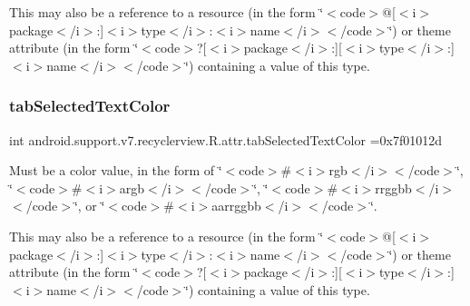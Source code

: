This may also be a reference to a resource (in the form \char`\"{}$<$code$>$@\mbox{[}$<$i$>$package$<$/i$>$\+:\mbox{]}$<$i$>$type$<$/i$>$\+:$<$i$>$name$<$/i$>$$<$/code$>$\char`\"{}) or theme attribute (in the form \char`\"{}$<$code$>$?\mbox{[}$<$i$>$package$<$/i$>$\+:\mbox{]}\mbox{[}$<$i$>$type$<$/i$>$\+:\mbox{]}$<$i$>$name$<$/i$>$$<$/code$>$\char`\"{}) containing a value of this type. \mbox{\label{classandroid_1_1support_1_1v7_1_1recyclerview_1_1R_1_1attr_affa0c815ddd832ba9ebad5e166e269c8}} 
\subsubsection{\texorpdfstring{tab\+Selected\+Text\+Color}{tabSelectedTextColor}}
{\footnotesize\ttfamily int android.\+support.\+v7.\+recyclerview.\+R.\+attr.\+tab\+Selected\+Text\+Color =0x7f01012d\hspace{0.3cm}{\ttfamily [static]}}

Must be a color value, in the form of \char`\"{}$<$code$>$\#$<$i$>$rgb$<$/i$>$$<$/code$>$\char`\"{}, \char`\"{}$<$code$>$\#$<$i$>$argb$<$/i$>$$<$/code$>$\char`\"{}, \char`\"{}$<$code$>$\#$<$i$>$rrggbb$<$/i$>$$<$/code$>$\char`\"{}, or \char`\"{}$<$code$>$\#$<$i$>$aarrggbb$<$/i$>$$<$/code$>$\char`\"{}. 

This may also be a reference to a resource (in the form \char`\"{}$<$code$>$@\mbox{[}$<$i$>$package$<$/i$>$\+:\mbox{]}$<$i$>$type$<$/i$>$\+:$<$i$>$name$<$/i$>$$<$/code$>$\char`\"{}) or theme attribute (in the form \char`\"{}$<$code$>$?\mbox{[}$<$i$>$package$<$/i$>$\+:\mbox{]}\mbox{[}$<$i$>$type$<$/i$>$\+:\mbox{]}$<$i$>$name$<$/i$>$$<$/code$>$\char`\"{}) containing a value of this type. \mbox{\label{classandroid_1_1support_1_1v7_1_1recyclerview_1_1R_1_1attr_a66eecedaeb90d2116d7ab5a1769d7163}} 
